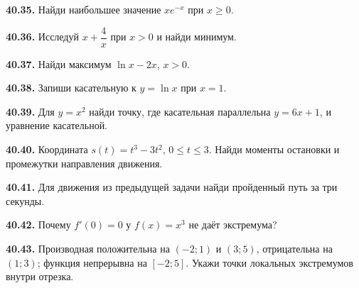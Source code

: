 \noindent\begin{minipage}[t]{\linewidth}\textbf{40.35.} Найди наибольшее значение \(xe^{-x}\) при \(x\ge0\).\par\end{minipage}\par
\noindent\begin{minipage}[t]{\linewidth}\textbf{40.36.} Исследуй \(x+\dfrac4x\) при \(x>0\) и найди минимум.\par\end{minipage}\par
\noindent\begin{minipage}[t]{\linewidth}\textbf{40.37.} Найди максимум \(\ln x-2x\), \(x>0\).\par\end{minipage}\par
\noindent\begin{minipage}[t]{\linewidth}\textbf{40.38.} Запиши касательную к \(y=\ln x\) при \(x=1\).\par\end{minipage}\par
\noindent\begin{minipage}[t]{\linewidth}\textbf{40.39.} Для \(y=x^2\) найди точку, где касательная параллельна \(y=6x+1\), и уравнение касательной.\par\end{minipage}\par
\noindent\begin{minipage}[t]{\linewidth}\textbf{40.40.} Координата \(s(t)=t^3-3t^2\), \(0\le t\le3\). Найди моменты остановки и промежутки направления движения.\par\end{minipage}\par
\noindent\begin{minipage}[t]{\linewidth}\textbf{40.41.} Для движения из предыдущей задачи найди пройденный путь за три секунды.\par\end{minipage}\par
\noindent\begin{minipage}[t]{\linewidth}\textbf{40.42.} Почему \(f'(0)=0\) у \(f(x)=x^3\) не даёт экстремума?\par\end{minipage}\par
\noindent\begin{minipage}[t]{\linewidth}\textbf{40.43.} Производная положительна на \((-2;1)\) и \((3;5)\), отрицательна на \((1;3)\); функция непрерывна на \([-2;5]\). Укажи точки локальных экстремумов внутри отрезка.\par\end{minipage}\par
